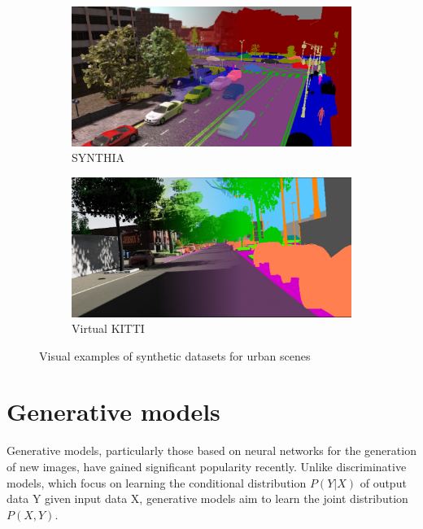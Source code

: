 \begin{figure}
  \begin{subfigure}{0.49\columnwidth}
    \includegraphics[width=\columnwidth]{img/2-related-work/syntia_semantic_segmentation_overlay.png}
    \caption{SYNTHIA \cite{SYNTHIA}}
    \label{fig:example-syntia}
  \end{subfigure}
  \begin{subfigure}[b]{0.49\columnwidth}
    \includegraphics[width=\columnwidth]{img/2-related-work/virtual-kitti_semantic_segmentation_overlay.png}
    \caption {Virtual KITTI \cite{kitty}}
    \label{fig:example-virtual-kitti}
  \end{subfigure}

  \caption[Visual examples of synthetic datasets for urban scenes]{Visual examples of synthetic datasets for urban scenes}
    \label{fig:synthetic-datasets-examples}

\end{figure}


\section{Generative models}
Generative models, particularly those based on neural networks for the generation of new images, have gained significant popularity recently. Unlike discriminative models, which focus on learning the conditional distribution $P(Y|X)$ of output data Y given input data X, generative models aim to learn the joint distribution $P(X,Y)$.

